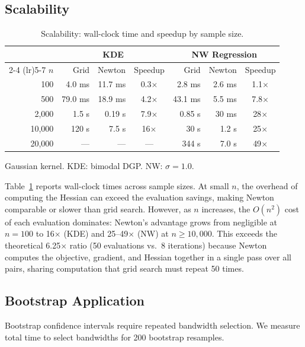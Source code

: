 \documentclass[11pt]{article}
\theoremstyle{definition}
\theoremstyle{remark}
\begin{document}
\subsection{Scalability}
\label{sec:timing}

\begin{table}[t]
\centering
\caption{Scalability: wall-clock time and speedup by sample size.}
\label{tab:scalability}
\begin{tabular}{rrrcrrc}
\toprule
 & \multicolumn{3}{c}{KDE} & \multicolumn{3}{c}{NW Regression} \\
\cmidrule(lr){2-4} \cmidrule(lr){5-7}
$n$ & Grid & Newton & Speedup & Grid & Newton & Speedup \\
\midrule
100 & 4.0 ms & 11.7 ms & 0.3$\times$ & 2.8 ms & 2.6 ms & 1.1$\times$ \\
500 & 79.0 ms & 18.9 ms & 4.2$\times$ & 43.1 ms & 5.5 ms & 7.8$\times$ \\
2,000 & 1.5 s & 0.19 s & 7.9$\times$ & 0.85 s & 30 ms & 28$\times$ \\
10,000 & 120 s & 7.5 s & 16$\times$ & 30 s & 1.2 s & 25$\times$ \\
20,000 & --- & --- & --- & 344 s & 7.0 s & 49$\times$ \\
\bottomrule
\end{tabular}

\vspace{0.5em}
\footnotesize
Gaussian kernel. KDE: bimodal DGP. NW: $\sigma=1.0$.
\end{table}

Table~\ref{tab:scalability} reports wall-clock times across sample sizes.
At small $n$, the overhead of computing the Hessian can exceed the evaluation savings, making Newton comparable or slower than grid search.
However, as $n$ increases, the $O(n^2)$ cost of each evaluation dominates: Newton's advantage grows from negligible at $n=100$ to 16$\times$ (KDE) and 25--49$\times$ (NW) at $n \geq 10{,}000$.
This exceeds the theoretical 6.25$\times$ ratio (50 evaluations vs.\ 8 iterations) because Newton computes the objective, gradient, and Hessian together in a single pass over all pairs, sharing computation that grid search must repeat 50 times.

\subsection{Bootstrap Application}
\label{sec:bootstrap}

Bootstrap confidence intervals require repeated bandwidth selection.
We measure total time to select bandwidths for 200 bootstrap resamples.
\end{document}
